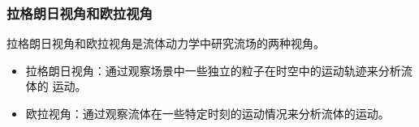 \documentclass[xcolor=svgnames,serif,table,10pt]{beamer}
\begin{document}
\begin{frame}
  \frametitle{拉格朗日视角和欧拉视角}
  \small
  拉格朗日视角和欧拉视角是流体动力学中研究流场的两种视角。\pause

  \begin{itemize}
  \item 拉格朗日视角：通过观察场景中一些独立的粒子在时空中的运动轨迹来分析流体的
    运动。\pause
  \item 欧拉视角：通过观察流体在一些特定时刻的运动情况来分析流体的运动。
  \end{itemize}

  \medskip
  \begin{columns}
    \centering
    \begin{column}{0.2\textwidth}
    \end{column}
    \begin{column}{0.6\textwidth}
    \end{column}
  \end{columns}
\end{frame}
\end{document}
